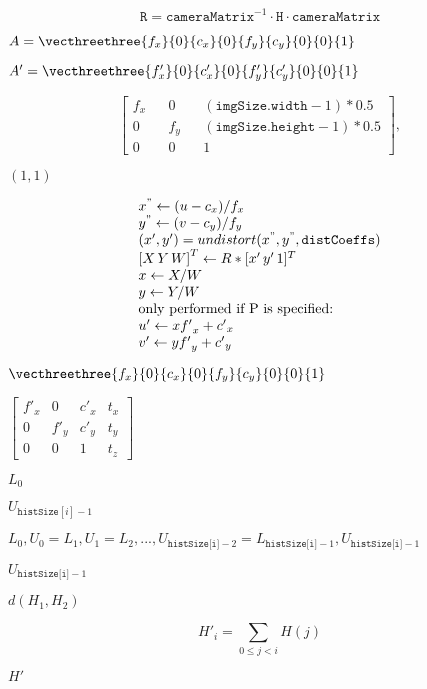 \documentclass{article}
\begin{document}
\[\texttt{R} = \texttt{cameraMatrix} ^{-1} \cdot \texttt{H} \cdot \texttt{cameraMatrix}\]
\pagebreak

$A=\vecthreethree{f_x}{0}{c_x}{0}{f_y}{c_y}{0}{0}{1}$
\pagebreak

$A'=\vecthreethree{f_x'}{0}{c_x'}{0}{f_y'}{c_y'}{0}{0}{1}$
\pagebreak

\[\begin{bmatrix} f_x && 0 && ( \texttt{imgSize.width} -1)*0.5 \\ 0 && f_y && ( \texttt{imgSize.height} -1)*0.5 \\ 0 && 0 && 1 \end{bmatrix} ,\]
\pagebreak

$(1,1)$
\pagebreak

\[ \begin{array}{l} x^{"} \leftarrow (u - c_x)/f_x \\ y^{"} \leftarrow (v - c_y)/f_y \\ (x',y') = undistort(x^{"},y^{"}, \texttt{distCoeffs}) \\ {[X\,Y\,W]} ^T \leftarrow R*[x' \, y' \, 1]^T \\ x \leftarrow X/W \\ y \leftarrow Y/W \\ \text{only performed if P is specified:} \\ u' \leftarrow x {f'}_x + {c'}_x \\ v' \leftarrow y {f'}_y + {c'}_y \end{array} \]
\pagebreak

$\vecthreethree{f_x}{0}{c_x}{0}{f_y}{c_y}{0}{0}{1}$
\pagebreak

$\begin{bmatrix} {f'}_x & 0 & {c'}_x & t_x \\ 0 & {f'}_y & {c'}_y & t_y \\ 0 & 0 & 1 & t_z \end{bmatrix}$
\pagebreak

$L_0$
\pagebreak

$U_{\texttt{histSize}[i]-1}$
\pagebreak

$L_0, U_0=L_1, U_1=L_2, ..., U_{\texttt{histSize[i]}-2}=L_{\texttt{histSize[i]}-1}, U_{\texttt{histSize[i]}-1}$
\pagebreak

$U_{\texttt{histSize[i]}-1}$
\pagebreak

$d(H_1, H_2)$
\pagebreak

\[H'_i = \sum _{0 \le j < i} H(j)\]
\pagebreak

$H'$
\pagebreak
\end{document}
